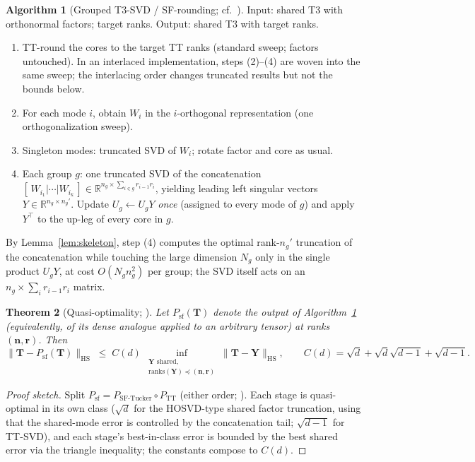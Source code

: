 \documentclass[11pt]{article}
\newtheorem{theorem}{Theorem}[section]
\theoremstyle{definition}
\newtheorem{algorithm}[theorem]{Algorithm}
\theoremstyle{remark}
\newcommand{\R}{\mathbb{R}}
\newcommand{\T}{\boldsymbol{T}}
\newcommand{\HS}{\mathrm{HS}}
\begin{document}
\begin{algorithm}[Grouped T3-SVD / SF-rounding; cf.~{\cite[Alg.~1]{MR2026}}]
\label{alg:rounding}
Input: shared T3 with orthonormal factors; target ranks. Output: shared T3
with target ranks.
\begin{enumerate}[label=\emph{(\arabic*)},itemsep=1pt,topsep=2pt]
\item TT-round the cores to the target TT ranks (standard sweep; factors
  untouched). In an interlaced implementation, steps (2)--(4) are woven into
  the same sweep; the interlacing order changes truncated results but not the
  bounds below.
\item For each mode $i$, obtain $W_i$ in the $i$-orthogonal representation
  (one orthogonalization sweep).
\item Singleton modes: truncated SVD of $W_i$; rotate factor and core as
  usual.
\item Each group $g$: one truncated SVD of the concatenation
  $[\,W_{i_1} | \cdots | W_{i_k}\,] \in \R^{n_g \times \sum_{i\in g}
  r_{i-1} r_i}$, yielding leading left singular vectors $Y \in \R^{n_g \times
  n_g'}$. Update $U_g \leftarrow U_g Y$ \emph{once} (assigned to every mode of
  $g$) and apply $Y^\top$ to the up-leg of every core in $g$.
\end{enumerate}
By Lemma~\ref{lem:skeleton}, step (4) computes the optimal rank-$n_g'$
truncation of the concatenation while touching the large dimension $N_g$ only
in the single product $U_g Y$, at cost $O(N_g n_g^2)$ per group; the SVD
itself acts on an $n_g \times \sum_i r_{i-1} r_i$ matrix.
\end{algorithm}

\begin{theorem}[Quasi-optimality; {\cite[Thm.~2]{MR2026}}]\label{thm:quasi}
Let $P_{\mathrm{sf}}(\T)$ denote the output of
Algorithm~\ref{alg:rounding} (equivalently, of its dense analogue applied to
an arbitrary tensor) at ranks $(\boldsymbol{n}, \boldsymbol{r})$. Then
\[
\bigl\| \T - P_{\mathrm{sf}}(\T) \bigr\|_{\HS}
\;\leq\;
C(d)\,
\inf_{\substack{\boldsymbol{Y} \text{ shared},\\
\mathrm{ranks}(\boldsymbol{Y}) \preceq (\boldsymbol{n},\boldsymbol{r})}}
\bigl\| \T - \boldsymbol{Y} \bigr\|_{\HS},
\qquad
C(d) = \sqrt{d} + \sqrt{d}\sqrt{d-1} + \sqrt{d-1}.
\]
\end{theorem}

\begin{proof}[Proof sketch]
Split $P_{\mathrm{sf}} = P_{\mathrm{SF\text{-}Tucker}} \circ
P_{\mathrm{TT}}$ (either order; \cite[Rem.~1]{MR2026}). Each stage is
quasi-optimal in its own class ($\sqrt{d}$ for the HOSVD-type shared factor
truncation, using that the shared-mode error is controlled by the
concatenation tail; $\sqrt{d-1}$ for TT-SVD), and each stage's best-in-class
error is bounded by the best shared error via the triangle inequality; the
constants compose to $C(d)$.
\end{proof}
\end{document}
